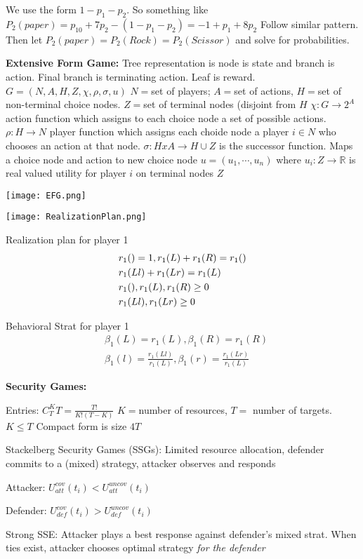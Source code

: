 \documentclass[10pt,letter]{article}
\begin{document}
\begin{multicols}{2}
We use the form $1-p_1-p_2$. So something like 
$P_2(paper) = p_10 + 7p_2 - (1-p_1-p_2) = -1 + p_1 + 8p_2$
Follow similar pattern. Then let $P_2(paper) = P_2(Rock) = P_2(Scissor)$ and solve
for probabilities.

\textbf{Extensive Form Game:} Tree representation is node is state and branch
is action. Final branch is terminating action. Leaf is reward. 
$G=(N,A,H,Z,\chi,\rho,\sigma,u)$ $N=$set of players; $A=$set of actions, $H=$set 
of non-terminal choice nodes. $Z=$set of terminal nodes (disjoint from $H$
$\chi:G\to 2^A$ action function which assigns to each choice node a set
of possible actions. $\rho:H\to N$ player function which assigns each choide
node a player $i\in N$ who chooses an action at that node. $\sigma:H x A\to H\cup Z$
is the successor function. Maps a choice node and action to new choice node
$u=(u_1,\cdots,u_n)$ where $u_i:Z\to\mathbb{R}$ is real valued utility for player
$i$ on terminal nodes $Z$

\texttt{[image: EFG.png]}


\texttt{[image: RealizationPlan.png]}

Realization plan for player 1
\begin{align*}
    &r_1(\null) = 1, r_1(L) + r_1(R) = r_1(\null)\\
    &r_1(Ll) + r_1(Lr) = r_1(L)\\
    &r_1(\null),r_1(L), r_1(R) \geq 0\\
    &r_1(Ll), r_1(Lr) \geq 0
\end{align*}

Behavioral Strat for player 1
\begin{align*}
    &\beta_1(L) = r_1(L), \beta_1(R)=r_1(R)\\
    &\beta_1(l) = \frac{r_1(Ll)}{r_1(L)}, \beta_1(r)=\frac{r_1(Lr)}{r_1(L)}
\end{align*}


\textbf{Security Games:}

Entries: $C_T^KT=\frac{T!}{K!(T-K)}$ $K=$number of resources, $T=$ number of targets. 
$K\leq T$ Compact form is size $4T$

Stackelberg Security Games (SSGs): Limited resource allocation, defender commits
to a (mixed) strategy, attacker observes and responds

    Attacker: $U_{att}^{cov}(t_i) < U_{att}^{uncov}(t_i)$

    Defender: $U_{def}^{cov}(t_i) > U_{def}^{uncov}(t_i)$

Strong SSE: Attacker plays a best response against defender's mixed strat. When
ties exist, attacker chooses optimal strategy \textit{for the defender}


\end{multicols}
\end{document}
